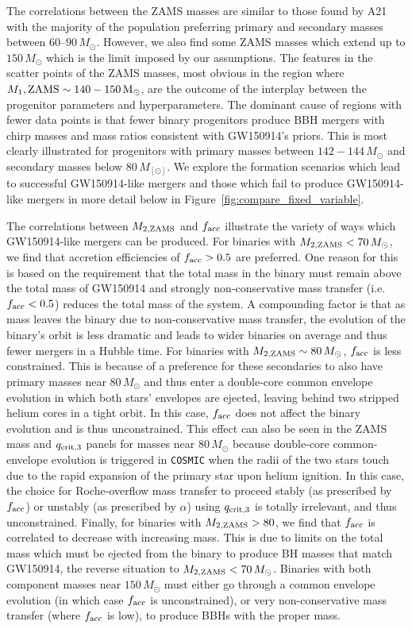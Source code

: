 \documentclass[linenumbers,twocolumn]{aastex631}
\begin{document}
The correlations between the ZAMS masses are similar to those found by A21 with
the majority of the population preferring primary and secondary masses between
$60$--$90\,M_{\odot}$. However, we also find some ZAMS masses which extend up to
$150\,M_{\odot}$ which is the limit imposed by our assumptions. The features in the scatter points of the ZAMS masses, most obvious in the region where $M_1,\rm{ZAMS}\sim 140-150\,M_\odot$, are the outcome of the interplay between the progenitor parameters and hyperparameters. The dominant cause of regions with fewer data points is that fewer binary progenitors produce BBH mergers with chirp masses and mass ratios consistent with GW150914's priors. This is most clearly illustrated for progenitors with primary masses between $142-144\,M_\odot$ and secondary masses below $80\,M_[\odot]$. We explore the
formation scenarios which lead to successful GW150914-like mergers and those
which fail to produce GW150914-like mergers in more detail below in
Figure~\ref{fig:compare_fixed_variable}.

The correlations between $M_{2,\rm{ZAMS}}$ and $f_{\rm acc}$ illustrate the
variety of ways which GW150914-like mergers can be produced. For binaries with
$M_{2,\rm{ZAMS}} < 70\,M_{\odot}$, we find that accretion efficiencies of
$f_{\rm acc} > 0.5$ are preferred. One reason for this is based on the
requirement that the total mass in the binary must remain above the total mass
of GW150914 and strongly non-conservative mass transfer (i.e. $f_{\rm acc} <
0.5$) reduces the total mass of the system. A compounding factor is that as mass
leaves the binary due to non-conservative mass transfer, the evolution of the
binary's orbit is less dramatic and leads to wider binaries on average and thus
fewer mergers in a Hubble time. For binaries with $M_{2,\rm{ZAMS}} \sim
80\,M_{\odot}$, $f_{\rm acc}$ is less constrained. This is because of a
preference for these secondaries to also have primary masses near $
80\,M_{\odot}$ and thus enter a double-core common envelope evolution in which
both stars' envelopes are ejected, leaving behind two stripped helium cores in a
tight orbit. In this case, $f_{\rm acc}$ does not affect the binary evolution
and is thus unconstrained. This effect can also be seen in the ZAMS mass and
$q_{\rm crit, 3}$ panels for masses near $80\,M_{\odot}$ because double-core
common-envelope evolution is triggered in \texttt{COSMIC} when the radii of the
two stars touch due to the rapid expansion of the primary star upon helium
ignition. In this case, the choice for Roche-overflow mass transfer to proceed
stably (as prescribed by $f_{\rm{acc}}$) or unstably (as prescribed by $\alpha$)
using $q_{\rm crit, 3}$ is totally irrelevant, and thus unconstrained. Finally,
for binaries with $M_{2,\rm{ZAMS}} > 80$, we find that $f_{\rm acc}$ is
correlated to decrease with increasing mass. This is due to limits on the total
mass which must be ejected from the binary to produce BH masses that match
GW150914, the reverse situation to $M_{2,\rm{ZAMS}} < 70 \, M_\odot$. Binaries
with both component masses near $150\,M_{\odot}$ must either go through a common
envelope evolution (in which case $f_{\rm acc}$ is unconstrained), or very
non-conservative mass transfer (where $f_{\rm acc}$ is low), to produce BBHs
with the proper mass.
\end{document}
